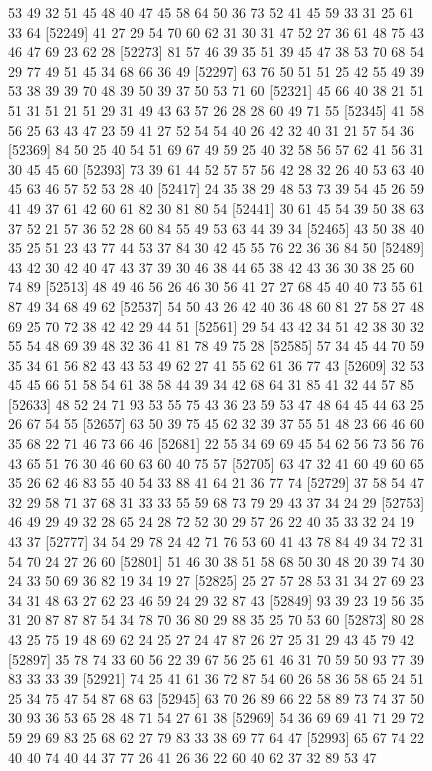 \documentclass{article}
\begin{document}
\begin{figure}[H]
\begin{Schunk}
\begin{Soutput}
[52225] 53 49 32 51 45 48 40 47 45 58 64 50 36 73 52 41 45 59 33 31 25 61 33 64
[52249] 41 27 29 54 70 60 62 31 30 31 47 52 27 36 61 48 75 43 46 47 69 23 62 28
[52273] 81 57 46 39 35 51 39 45 47 38 53 70 68 54 29 77 49 51 45 34 68 66 36 49
[52297] 63 76 50 51 51 25 42 55 49 39 53 38 39 39 70 48 39 50 39 37 50 53 71 60
[52321] 45 66 40 38 21 51 51 31 51 21 51 29 31 49 43 63 57 26 28 28 60 49 71 55
[52345] 41 58 56 25 63 43 47 23 59 41 27 52 54 54 40 26 42 32 40 31 21 57 54 36
[52369] 84 50 25 40 54 51 69 67 49 59 25 40 32 58 56 57 62 41 56 31 30 45 45 60
[52393] 73 39 61 44 52 57 57 56 42 28 32 26 40 53 63 40 45 63 46 57 52 53 28 40
[52417] 24 35 38 29 48 53 73 39 54 45 26 59 41 49 37 61 42 60 61 82 30 81 80 54
[52441] 30 61 45 54 39 50 38 63 37 52 21 57 36 52 28 60 84 55 49 53 63 44 39 34
[52465] 43 50 38 40 35 25 51 23 43 77 44 53 37 84 30 42 45 55 76 22 36 36 84 50
[52489] 43 42 30 42 40 47 43 37 39 30 46 38 44 65 38 42 43 36 30 38 25 60 74 89
[52513] 48 49 46 56 26 46 30 56 41 27 27 68 45 40 40 73 55 61 87 49 34 68 49 62
[52537] 54 50 43 26 42 40 36 48 60 81 27 58 27 48 69 25 70 72 38 42 42 29 44 51
[52561] 29 54 43 42 34 51 42 38 30 32 55 54 48 69 39 48 32 36 41 81 78 49 75 28
[52585] 57 34 45 44 70 59 35 34 61 56 82 43 43 53 49 62 27 41 55 62 61 36 77 43
[52609] 32 53 45 45 66 51 58 54 61 38 58 44 39 34 42 68 64 31 85 41 32 44 57 85
[52633] 48 52 24 71 93 53 55 75 43 36 23 59 53 47 48 64 45 44 63 25 26 67 54 55
[52657] 63 50 39 75 45 62 32 39 37 55 51 48 23 66 46 60 35 68 22 71 46 73 66 46
[52681] 22 55 34 69 69 45 54 62 56 73 56 76 43 65 51 76 30 46 60 63 60 40 75 57
[52705] 63 47 32 41 60 49 60 65 35 26 62 46 83 55 40 54 33 88 41 64 21 36 77 74
[52729] 37 58 54 47 32 29 58 71 37 68 31 33 33 55 59 68 73 79 29 43 37 34 24 29
[52753] 46 49 29 49 32 28 65 24 28 72 52 30 29 57 26 22 40 35 33 32 24 19 43 37
[52777] 34 54 29 78 24 42 71 76 53 60 41 43 78 84 49 34 72 31 54 70 24 27 26 60
[52801] 51 46 30 38 51 58 68 50 30 48 20 39 74 30 24 33 50 69 36 82 19 34 19 27
[52825] 25 27 57 28 53 31 34 27 69 23 34 31 48 63 27 62 23 46 59 24 29 32 87 43
[52849] 93 39 23 19 56 35 31 20 87 87 87 54 34 78 70 36 80 29 88 35 25 70 53 60
[52873] 80 28 43 25 75 19 48 69 62 24 25 27 24 47 87 26 27 25 31 29 43 45 79 42
[52897] 35 78 74 33 60 56 22 39 67 56 25 61 46 31 70 59 50 93 77 39 83 33 33 39
[52921] 74 25 41 61 36 72 87 54 60 26 58 36 58 65 24 51 25 34 75 47 54 87 68 63
[52945] 63 70 26 89 66 22 58 89 73 74 37 50 30 93 36 53 65 28 48 71 54 27 61 38
[52969] 54 36 69 69 41 71 29 72 59 29 69 83 25 68 62 27 79 83 33 38 69 77 64 47
[52993] 65 67 74 22 40 40 74 40 44 37 77 26 41 26 36 22 60 40 62 37 32 89 53 47

\end{Soutput}
\end{Schunk}
\end{figure}
\end{document}
